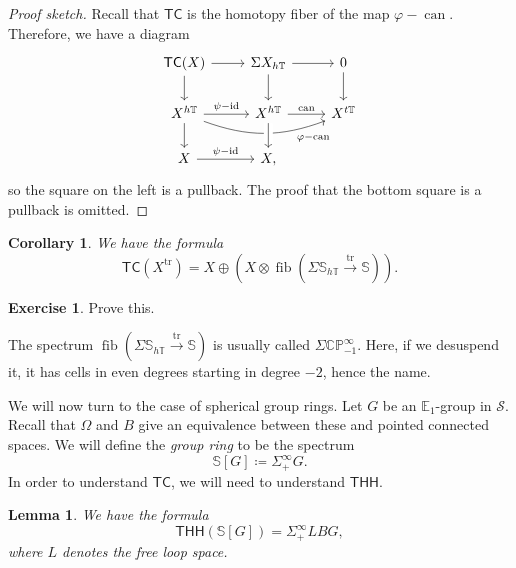 \documentclass[10pt, oneside]{memoir}
\newtheorem{cor}[thm]{Corollary}
\newtheorem{lem}[thm]{Lemma}
\theoremstyle{definition}
\newtheorem{exer}[thm]{Exercise}
\theoremstyle{remark}
\theoremstyle{plain}
\theoremstyle{definition}
\theoremstyle{remark}
\newcommand{\C}{\mathbb{C}}
\newcommand{\E}{\mathbb{E}}
\newcommand{\bS}{\mathbb{S}}
\renewcommand{\P}{\mathbb{P}}
\newcommand{\mc}[1]{\mathcal{#1}}
\newcommand{\T}{\mathbb{T}}
\newcommand{\on}[1]{\operatorname{#1}}
\newcommand{\ms}[1]{\mathsf{#1}}
\newcommand{\1}{\mathbf{1}}
\newcommand{\2}{\mathbf{2}}
\newcommand{\3}{\mathbf{3}}
\newcommand{\THH}{\ms{THH}}
\newcommand{\TC}{\ms{TC}}
\begin{document}
\begin{proof}[Proof sketch]
    Recall that \(\TC \) is the homotopy fiber of the map \(\varphi - \on{can} \). Therefore, we have a diagram
    \begin{equation*}
    \begin{tikzcd}
        \TC(X) \ar{d} \ar{r} & \Sigma X_{h\T} \ar{d} \ar{r} & 0 \ar{d} \\
        X^{h\T} \ar{d} \ar{r}{\psi - \on{id}} \ar[bend right=20]{rr}[swap, near end]{\varphi - \on{can}} & X^{h\T} \ar[crossing over]{d} \ar{r}{\on{can}} & X^{t\T} \\
        X \ar{r}{\psi - \on{id}} & X,
    \end{tikzcd}
    \end{equation*}
    so the square on the left is a pullback. The proof that the bottom square is a pullback is omitted.
\end{proof}

\begin{cor}
    We have the formula
    \[ \TC(X^{\on{tr}}) = X \oplus (X \otimes \on{fib}(\Sigma \bS_{h\T} \xrightarrow{\on{tr}} \bS)). \]
\end{cor}

\begin{exer}
    Prove this.
\end{exer}

The spectrum \(\on{fib}(\Sigma \bS_{h\T} \xrightarrow{\on{tr}} \bS) \) is usually called \(\Sigma \C\P^{\infty}_{-1} \). Here, if we desuspend it, it has cells in even degrees starting in degree \(-2 \), hence the name.

We will now turn to the case of spherical group rings. Let \(G \) be an \(\E_1 \)-group in \(\mc{S} \). Recall that \(\Omega \) and \(B \) give an equivalence between these and pointed connected spaces. We will define the \textit{group ring} to be the spectrum
\[ \bS[G] \coloneqq \Sigma_+^{\infty} G. \]
In order to understand \(\TC \), we will need to understand \(\THH \).

\begin{lem}
    We have the formula
    \[ \THH(\bS[G]) = \Sigma_+^{\infty} LBG, \]
    where \(L \) denotes the free loop space.
\end{lem}
\end{document}
